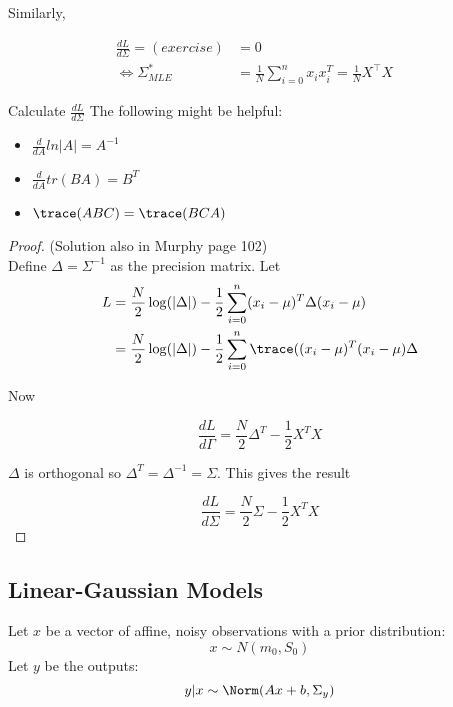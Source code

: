 \documentclass{article}
\begin{document}
\noindent Similarly,

\begin{align*}
\frac{dL}{d\Sigma} = (exercise) & = 0 & \\
\Leftrightarrow \Sigma^*_{MLE} & = \frac{1}{N} \sum_{i=0}^{n} x_i x_i^T = \frac{1}{N} X^\top X
\end{align*}

\begin{exercise}
Calculate $\frac{dL}{d\Sigma}$ The following might be helpful: 
\begin{itemize}
\item $\frac{d}{dA} ln |A| = A^{-1}$ \\
\item $\frac{d}{dA} tr(BA) = B^T$ \\
\item $\trace(ABC) = \trace(BCA)$
\end{itemize}
\end{exercise}

\begin{proof}
(Solution also in Murphy page 102) \\
Define $\Delta = \Sigma^{-1}$ as the precision matrix. Let 
\begin{align*}
L &= \frac{N}{2} \log(|\Delta|) - \frac{1}{2} \sum_{i=0}^{n}(x_i-\mu)^T \Delta (x_i-\mu) \\
&= \frac{N}{2} \log(|\Delta|) - \frac{1}{2} \sum_{i=0}^{n} \trace((x_i-\mu)^T (x_i-\mu) \Delta
\end{align*}

Now 

$$\frac{dL}{d\Gamma} = \frac{N}{2} \Delta^{T} - \frac{1}{2} X^T X  $$


$\Delta$ is orthogonal so $\Delta^T = \Delta^{-1} = \Sigma$. This gives the result

$$\frac{dL}{d\Sigma} = \frac{N}{2} \Sigma - \frac{1}{2} X^T X   $$
\end{proof}



 
\subsection{Linear-Gaussian Models}

Let $x$ be a vector of affine, noisy observations with a prior distribution: $$x \sim N(m_0, S_0)$$ Let $y$ be the outputs: $$y|x \sim \Norm(Ax + b, \Sigma_y)$$
\end{document}
